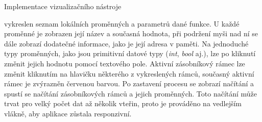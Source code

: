 \documentclass[czech,bachelor,male,python,dept460]{diploma}						%
\begin{document}
\begin{section}{Implementace vizualizačního nástroje}
\begin{description}
			vykreslen seznam lokálních proměnných a parametrů dané funkce. U každé proměnné je zobrazen její název a současná hodnota, při podržení myši nad ní se dále
			zobrazí dodatečné informace, jako je její adresa v paměti. Na jednoduché typy proměnných, jako jsou primitivní datové typy (\textit{int}, \textit{bool}
			aj.), lze po kliknutí změnit jejich hodnotu pomocí textového pole. Aktivní zásobníkový rámec lze změnit kliknutím na hlavičku některého z vykreslených
			rámců, současný aktivní rámec je zvýrazněn červenou barvou. Po zastavení procesu se zobrazí načítání a spustí se načítání zásobníkových
			rámců a jejich proměnných. Toto načítání může trvat pro velký počet dat až několik vteřin, proto je prováděno na vedlejším vlákně, aby aplikace
			zůstala responzivní.
	\end{description}

\end{section}
\end{document}
